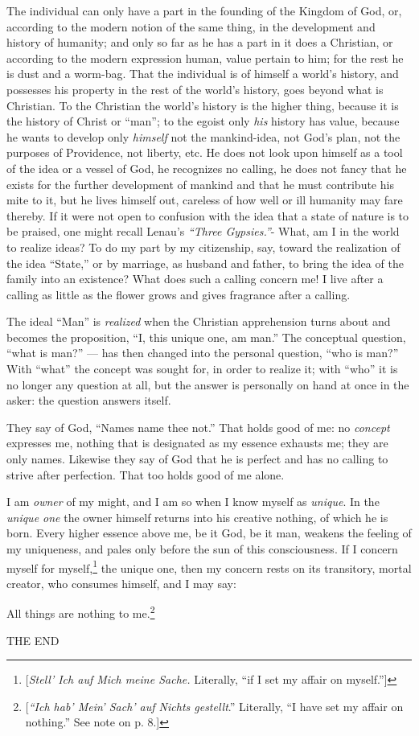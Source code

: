 The individual can only have a part in the founding of the Kingdom of God, or, 
according to the modern notion of the same thing, in the development and 
history of humanity; and only so far as he has a part in it does a Christian, 
or according to the modern expression human, value pertain to him; for the 
rest he is dust and a worm-bag. That the individual is of himself a world's 
history, and possesses his property in the rest of the world's history, goes 
beyond what is Christian. To the Christian the world's history is the higher 
thing, because it is the history of Christ or ``man''; to the egoist only 
\textit{his} history has value, because he wants to develop only 
\textit{himself} not the mankind-idea, not God's plan, not the purposes of 
Providence, not liberty, etc. He does not look upon himself as a tool of the 
idea or a vessel of God, he recognizes no calling, he does not fancy that he 
exists for the further development of mankind and that he must contribute his 
mite to it, but he lives himself out, careless of how well or ill humanity may 
fare thereby. If it were not open to confusion with the idea that a state of 
nature is to be praised, one might recall Lenau's \textit{``Three 
Gypsies.''}- What, am I in the world to realize ideas? To do my part by my 
citizenship, say, toward the realization of the idea ``State,'' or by 
marriage, as husband and father, to bring the idea of the family into an 
existence? What does such a calling concern me! I live after a calling as 
little as the flower grows and gives fragrance after a calling.

The ideal ``Man'' is \textit{realized} when the Christian apprehension turns 
about and becomes the proposition, ``I, this unique one, am man.'' The 
conceptual question, ``what is man?'' --- has then changed into the personal 
question, ``who is man?'' With ``what'' the concept was sought for, in 
order to realize it; with ``who'' it is no longer any question at all, but 
the answer is personally on hand at once in the asker: the question answers 
itself.

They say of God, ``Names name thee not.'' That holds good of me: no 
\textit{concept} expresses me, nothing that is designated as my essence 
exhausts me; they are only names. Likewise they say of God that he is perfect 
and has no calling to strive after perfection. That too holds good of me 
alone.

I am \textit{owner} of my might, and I am so when I know myself as 
\textit{unique}. In the \textit{unique one} the owner himself returns into his 
creative nothing, of which he is born. Every higher essence above me, be it 
God, be it man, weakens the feeling of my uniqueness, and pales only before 
the sun of this consciousness. If I concern myself for 
myself,\footnote{[\textit{Stell' Ich auf Mich meine Sache.} Literally, ``if I 
set my affair on myself.'']} the unique one, then my concern rests on its 
transitory, mortal creator, who consumes himself, and I may say:

All things are nothing to me.\footnote{[\textit{``Ich hab' Mein' Sach' auf 
Nichts gestellt}.'' Literally, ``I have set my affair on nothing.'' See 
note on p. 8.]}

\begin{center}
THE END\end{center}
